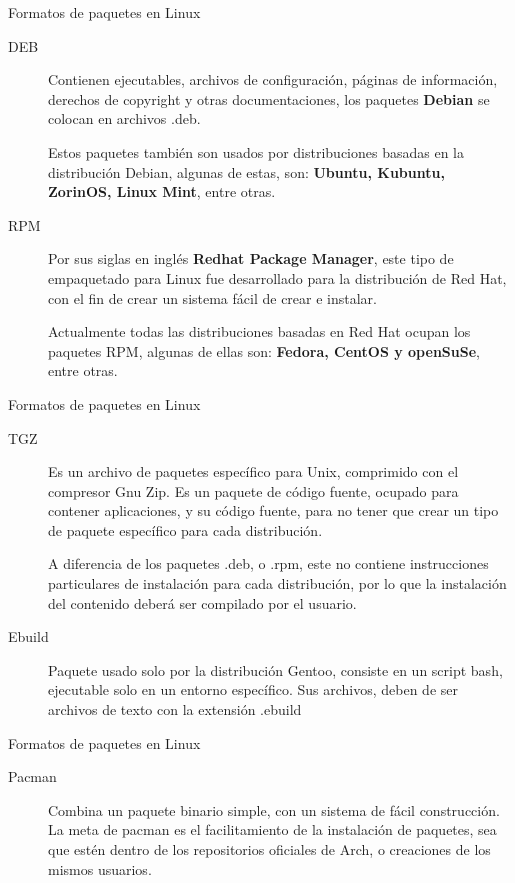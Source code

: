 \begin{frame}[c]{Formatos de paquetes en Linux}
  \begin{description}
    \item [DEB] Contienen ejecutables, archivos de configuración,
      páginas de información, derechos de copyright y otras documentaciones,
      los paquetes \textbf{Debian} se colocan en archivos .deb.

      Estos paquetes también son usados por distribuciones basadas en la
      distribución Debian, algunas de estas, son: \textbf{Ubuntu, Kubuntu,
      ZorinOS, Linux Mint}, entre otras.

    \pausa
    \item [RPM] Por sus siglas en inglés \textbf{Redhat Package Manager},
      este tipo de empaquetado para Linux fue desarrollado para la
      distribución de Red Hat, con el fin de crear un sistema fácil de crear
      e instalar.

      Actualmente todas las distribuciones basadas en Red Hat ocupan los
      paquetes RPM, algunas de ellas son: \textbf{Fedora, CentOS y openSuSe},
      entre otras.
  \end{description}
\end{frame}

\begin{frame}[c]{Formatos de paquetes en Linux}
  \begin{description}
    \item [TGZ] Es un archivo de paquetes específico para Unix, comprimido
      con el compresor Gnu Zip. Es un paquete de código fuente, ocupado para
      contener aplicaciones, y su código fuente, para no tener que crear un
      tipo de paquete específico para cada distribución.

      A diferencia de los
      paquetes .deb, o .rpm, este no contiene instrucciones particulares de
      instalación para cada distribución, por lo que la instalación del
      contenido deberá ser compilado por el usuario.

    \pausa
    \item [Ebuild] Paquete usado solo por la distribución Gentoo, consiste en
      un script bash, ejecutable solo en un entorno específico. Sus archivos,
      deben de ser archivos de texto con la extensión .ebuild
  \end{description}
\end{frame}

\begin{frame}[c]{Formatos de paquetes en Linux}
  \begin{description}
    \item [Pacman] Combina un paquete binario simple, con un sistema de fácil
      construcción. La meta de pacman es el facilitamiento de la instalación
      de paquetes, sea que estén dentro de los repositorios oficiales de Arch,
      o creaciones de los mismos usuarios.
  \end{description}
\end{frame}


